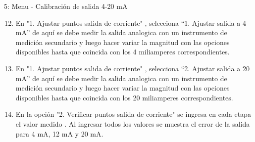 5: Menu - Calibración de salida 4-20 mA
\begin{enumerate}
\setcounter{enumi}{11}
\item En "1. Ajustar puntos salida de corriente" , selecciona  “1.  Ajustar salida a 4 mA” de aquí se debe medir la salida analogica con un instrumento de medición secundario y luego hacer variar la magnitud con las opciones disponibles hasta que coincida con los 4 miliamperes correspondientes.
\item En "1. Ajustar puntos salida de corriente" , selecciona  “2. Ajustar salida a 20 mA” de aquí se debe medir la salida analogica con un instrumento de medición secundario y luego hacer variar la magnitud con las opciones disponibles hasta que coincida con los 20 miliamperes correspondientes.
\item En  la opción "2. Verificar puntos salida de corriente" se ingresa en cada etapa el valor medido . Al ingresar todos los valores se muestra el error de la salida para 4 mA, 12 mA y 20 mA.
\end{enumerate}



